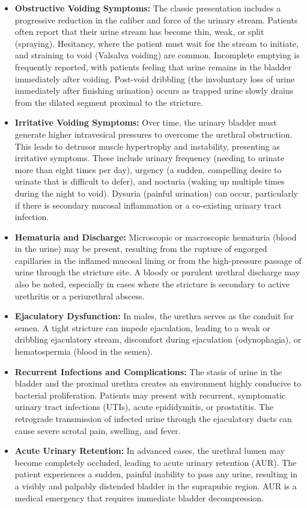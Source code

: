 \begin{itemize}
  \item \textbf{Obstructive Voiding Symptoms:} The classic presentation includes a progressive reduction in the caliber and force of the urinary stream. Patients often report that their urine stream has become thin, weak, or split (spraying). Hesitancy, where the patient must wait for the stream to initiate, and straining to void (Valsalva voiding) are common. Incomplete emptying is frequently reported, with patients feeling that urine remains in the bladder immediately after voiding. Post-void dribbling (the involuntary loss of urine immediately after finishing urination) occurs as trapped urine slowly drains from the dilated segment proximal to the stricture.
  \item \textbf{Irritative Voiding Symptoms:} Over time, the urinary bladder must generate higher intravesical pressures to overcome the urethral obstruction. This leads to detrusor muscle hypertrophy and instability, presenting as irritative symptoms. These include urinary frequency (needing to urinate more than eight times per day), urgency (a sudden, compelling desire to urinate that is difficult to defer), and nocturia (waking up multiple times during the night to void). Dysuria (painful urination) can occur, particularly if there is secondary mucosal inflammation or a co-existing urinary tract infection.
  \item \textbf{Hematuria and Discharge:} Microscopic or macroscopic hematuria (blood in the urine) may be present, resulting from the rupture of engorged capillaries in the inflamed mucosal lining or from the high-pressure passage of urine through the stricture site. A bloody or purulent urethral discharge may also be noted, especially in cases where the stricture is secondary to active urethritis or a periurethral abscess.
  \item \textbf{Ejaculatory Dysfunction:} In males, the urethra serves as the conduit for semen. A tight stricture can impede ejaculation, leading to a weak or dribbling ejaculatory stream, discomfort during ejaculation (odynophagia), or hematospermia (blood in the semen).
  \item \textbf{Recurrent Infections and Complications:} The stasis of urine in the bladder and the proximal urethra creates an environment highly conducive to bacterial proliferation. Patients may present with recurrent, symptomatic urinary tract infections (UTIs), acute epididymitis, or prostatitis. The retrograde transmission of infected urine through the ejaculatory ducts can cause severe scrotal pain, swelling, and fever.
  \item \textbf{Acute Urinary Retention:} In advanced cases, the urethral lumen may become completely occluded, leading to acute urinary retention (AUR). The patient experiences a sudden, painful inability to pass any urine, resulting in a visibly and palpably distended bladder in the suprapubic region. AUR is a medical emergency that requires immediate bladder decompression.
\end{itemize}

